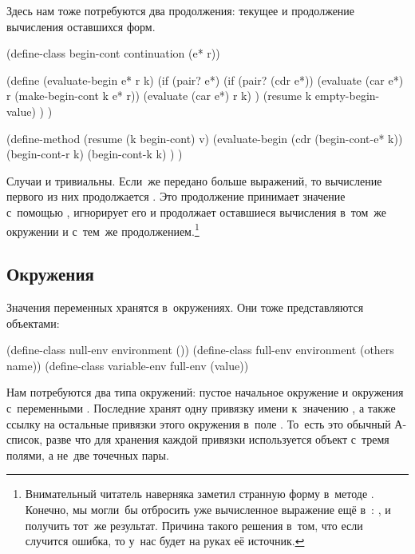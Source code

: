 Здесь нам тоже потребуются два продолжения: текущее и продолжение вычисления
оставшихся форм.

\begin{code:lisp}
(define-class begin-cont continuation (e* r))

(define (evaluate-begin e* r k)
  (if (pair? e*)
    (if (pair? (cdr e*))
        (evaluate (car e*) r (make-begin-cont k e* r))
        (evaluate (car e*) r k) )
    (resume k empty-begin-value) ) )

(define-method (resume (k begin-cont) v)
  (evaluate-begin (cdr (begin-cont-e* k))
                  (begin-cont-r k)
                  (begin-cont-k k) ) )
\end{code:lisp}

Случаи  и  тривиальны. Если~же 
передано больше выражений, то вычисление первого из них продолжается
. Это продолжение принимает значение~
с~помощью , игнорирует его и продолжает оставшиеся вычисления
в~том~же окружении и с~тем~же продолжением.\footnote*{Внимательный читатель
наверняка заметил странную форму  в~методе
. Конечно, мы могли~бы отбросить уже вычисленное выражение ещё
в~: , и получить тот~же
результат. Причина такого решения в~том, что если случится ошибка, то у~нас
будет на руках её источник.}


\subsection{Окружения}\label{escape/actors/ssect:variables}

Значения переменных хранятся в~окружениях. Они тоже представляются объектами:

\begin{code:lisp}
(define-class null-env environment ())
(define-class full-env environment (others name))
(define-class variable-env full-env (value))
\end{code:lisp}

Нам потребуются два типа окружений: пустое начальное окружение  и
окружения с~переменными . Последние хранят одну привязку имени
 к~значению , а также ссылку на остальные привязки этого
окружения в~поле . То~есть это обычный А-список, разве что для
хранения каждой привязки используется объект с~тремя полями, а не~две точечных
пары.

